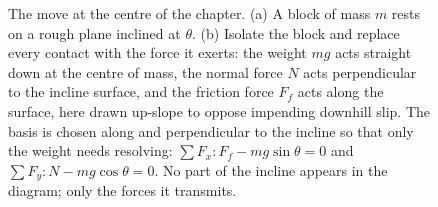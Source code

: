 \begin{figure}[htbp]
\caption[A block on a rough incline and its free-body diagram]{The
move at the centre of the chapter. (a) A block of mass $m$ rests on a
rough plane inclined at $\theta$. (b) Isolate the block and replace
every contact with the force it exerts: the weight $mg$ acts straight
down at the centre of mass, the normal force $N$ acts perpendicular to
the incline surface, and the friction force $F_f$ acts along the
surface, here drawn up-slope to oppose impending downhill slip. The
basis is chosen along and perpendicular to the incline so that only the
weight needs resolving: $\sum F_x: F_f - mg\sin\theta = 0$ and $\sum
F_y: N - mg\cos\theta = 0$. No part of the incline appears in the
diagram; only the forces it transmits.}
\label{fig:vol03ch01:fbd-block-incline}
\end{figure}
